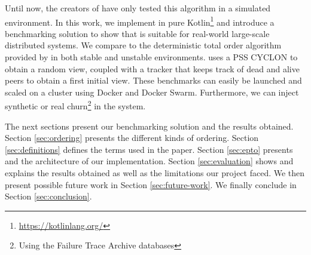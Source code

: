 Until now, the creators of \epto have only tested this algorithm in a simulated environment. In this work, we implement \epto in pure Kotlin\footnote{\href{https://kotlinlang.org/}{https://kotlinlang.org/}} and introduce a benchmarking solution to show that \epto is suitable for real-world large-scale distributed systems. We compare \epto to the deterministic total order algorithm provided by \jgroups \autocite{jgroups} in both stable and unstable environments. \epto uses a PSS CYCLON \autocite{Voulgaris2005} to obtain a random view, coupled with a tracker that keeps track of dead and alive peers to obtain a first initial view. These benchmarks can easily be launched and scaled on a cluster using Docker and Docker Swarm. Furthermore, we can inject synthetic or real churn\footnote{Using the Failure Trace Archive databases} in the system.
\par
The next sections present our benchmarking solution and the results obtained. Section \ref{sec:ordering} presents the different kinds of ordering. Section \ref{sec:definitions} defines the terms used in the paper. Section \ref{sec:epto} presents \epto and the architecture of our implementation. Section \ref{sec:evaluation} shows and explains the results obtained as well as the limitations our project faced. We then present possible future work in Section \ref{sec:future-work}. We finally conclude in Section \ref{sec:conclusion}.
